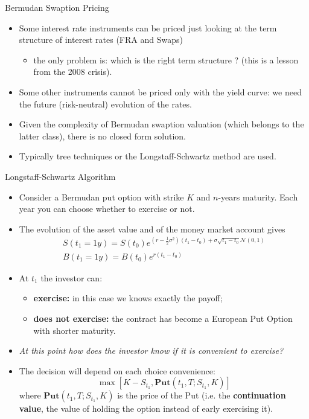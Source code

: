 \documentclass{beamer}
\begin{document}
	\begin{frame}{Bermudan Swaption Pricing}
		\begin{itemize}
			\item<1-> Some interest rate instruments can be priced just looking at the term structure of interest rates (FRA and Swaps)
			\begin{itemize}
				\item the only problem is: which is the right term structure ? (this is a lesson from the 2008 crisis).
			\end{itemize}
			\item<2-> Some other instruments cannot be priced only with the yield curve: we need the future (risk-neutral) evolution of the rates.
			\item<3-> Given the complexity of Bermudan swaption valuation (which belongs to the latter class), there is no closed form solution.
			\item<3-> Typically tree techniques or the Longstaff-Schwartz method are used.
		\end{itemize}
	\end{frame}

	\begin{frame}{Longstaff-Schwartz Algorithm}
		\begin{itemize}
			\item Consider a Bermudan put option with strike $K$ and $n$-years maturity. Each year you can choose whether to exercise or not.
			\item The evolution of the asset value and of the money market account gives
			\begin{equation}
				\begin{gathered}
					S(t_1=1y) = S(t_0)e^{(r-\frac{1}{2}\sigma^2)(t_1-t_0)+\sigma\sqrt{t_1-t_0}\mathcal{N}(0,1)} \\
					B(t_1=1y)=B(t_0)e^{r(t_1-t_0)}
				\end{gathered}
			\end{equation}
			\item At $t_1$ the investor can:
			\begin{itemize}
				\item \textbf{exercise:} in this case we knows exactly the payoff;
				\item \textbf{does not exercise:} the contract has become a European Put Option with shorter maturity.
			\end{itemize}
			\item \emph{At this point how does the investor know if it is convenient to exercise?}
			\item The decision will depend on each choice convenience:
			\begin{equation*}
				\max[K-S_{t_1}, \textbf{Put}(t_1,T;S_{t_1},K)]
			\end{equation*}
			where $\textbf{Put}(t_1,T;S_{t_1},K)$ is the price of the Put (i.e. the \textbf{continuation value}, the value of holding the option instead of early exercising it).
		\end{itemize}
	\end{frame}
\end{document}
